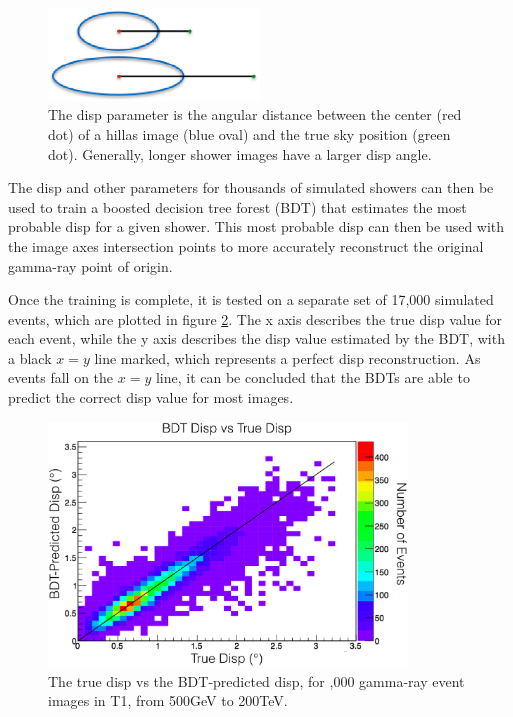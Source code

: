 \begin{figure}[ht]
  \begin{center}
    \includegraphics[width=0.5\textwidth]{images/disp_parameter_cropped.eps}
    \caption[Angular Reconstruction Disp]{The disp parameter is the angular distance between the center (red dot) of a hillas image (blue oval) and the true sky position (green dot).  Generally, longer shower images have a larger disp angle.}\label{fig:dispdiagram}
  \end{center}
\end{figure}

The disp and other parameters for thousands of simulated showers can then be used to train a boosted decision tree forest (BDT) that estimates the most probable disp for a given shower.
This most probable disp can then be used with the image axes intersection points to more accurately reconstruct the original gamma-ray point of origin.

Once the training is complete, it is tested on a separate set of 17,000 simulated events, which are plotted in figure \ref{fig:disptraining}.
The x axis describes the true disp value for each event, while the y axis describes the disp value estimated by the BDT, with a black $x=y$ line marked, which represents a perfect disp reconstruction.
As events fall on the $x=y$ line, it can be concluded that the BDTs are able to predict the correct disp value for most images.

\begin{figure}[ht]
  \begin{center}
    \includegraphics[width=0.85\textwidth]{images/disp_training.eps}
    \caption[Disp BDT Training]{The true disp vs the BDT-predicted disp, for ,000 gamma-ray event images in T1, from 500GeV to 200TeV.}\label{fig:disptraining}
  \end{center}
\end{figure}

